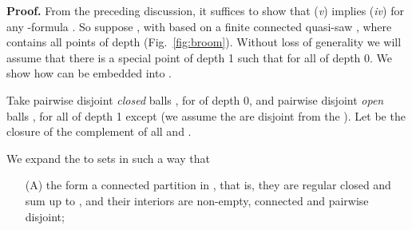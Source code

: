 \documentclass{article}
\newcommand{\qedsymbol}{\ding{113}}
\newenvironment{proof}{\par\noindent\textbf{Proof.}}{\mbox{}\hfill\qedsymbol\par\bigskip}
\begin{document}
\begin{proof}
From the preceding discussion, it suffices to show that ({\em v})
implies ({\em iv}) for any -formula . So suppose
, with  based on a finite
connected quasi-saw , where  contains all points
of depth  (Fig.~\ref{fig:broom}).  Without loss of
generality we will assume that there is a special point  of depth
1 such that  for all  of depth 0.  We show how
 can be embedded into .

Take pairwise disjoint \emph{closed} balls , for  of depth
0, and pairwise disjoint \emph{open} balls , for all  of depth
1 except  (we assume the  are disjoint from the
). Let  be the closure of the complement of all
 and .


We expand the  to sets  in such a way that
\begin{itemize}\itemsep=0pt
\item[(A)] the  form a connected partition in , that
  is, they are regular closed and sum up to , and their
  interiors are non-empty, connected and pairwise disjoint;


\end{itemize}
\end{proof}
\end{document}
